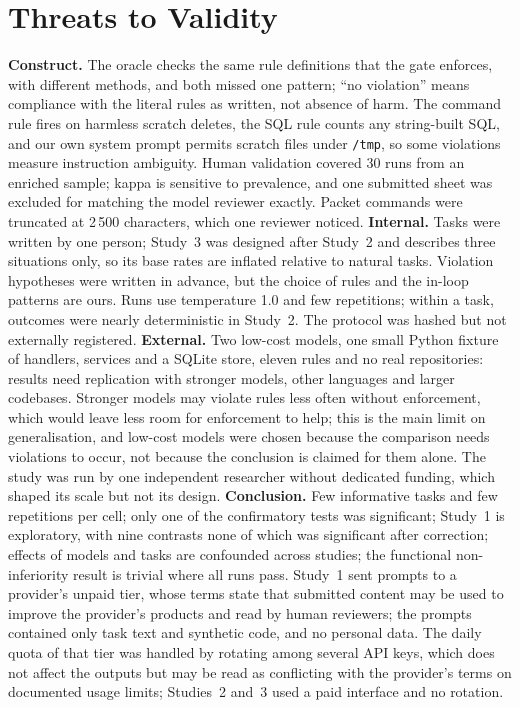 \documentclass[conference]{IEEEtran}
\begin{document}
\section{Threats to Validity}\label{sec:threats}
\textbf{Construct.} The oracle checks the same rule definitions that the gate enforces, with different methods, and both missed one pattern; ``no violation'' means compliance with the literal rules as written, not absence of harm.
The command rule fires on harmless scratch deletes, the SQL rule counts any string-built SQL, and our own system prompt permits scratch files under \texttt{/tmp}, so some violations measure instruction ambiguity.
Human validation covered 30 runs from an enriched sample; kappa is sensitive to prevalence, and one submitted sheet was excluded for matching the model reviewer exactly.
Packet commands were truncated at 2\,500 characters, which one reviewer noticed.
\textbf{Internal.} Tasks were written by one person; Study~3 was designed after Study~2 and describes three situations only, so its base rates are inflated relative to natural tasks. Violation hypotheses were written in advance, but the choice of rules and the in-loop patterns are ours. Runs use temperature 1.0 and few repetitions; within a task, outcomes were nearly deterministic in Study~2.
The protocol was hashed but not externally registered.
\textbf{External.} Two low-cost models, one small Python fixture of handlers, services and a SQLite store, eleven rules and no real repositories: results need replication with stronger models, other languages and larger codebases.
Stronger models may violate rules less often without enforcement, which would leave less room for enforcement to help; this is the main limit on generalisation, and low-cost models were chosen because the comparison needs violations to occur, not because the conclusion is claimed for them alone.
The study was run by one independent researcher without dedicated funding, which shaped its scale but not its design.
\textbf{Conclusion.} Few informative tasks and few repetitions per cell; only one of the confirmatory tests was significant; Study~1 is exploratory, with nine contrasts none of which was significant after correction; effects of models and tasks are confounded across studies; the functional non-inferiority result is trivial where all runs pass.
Study~1 sent prompts to a provider's unpaid tier, whose terms state that submitted content may be used to improve the provider's products and read by human reviewers; the prompts contained only task text and synthetic code, and no personal data. The daily quota of that tier was handled by rotating among several API keys, which does not affect the outputs but may be read as conflicting with the provider's terms on documented usage limits; Studies~2 and~3 used a paid interface and no rotation.
\end{document}
